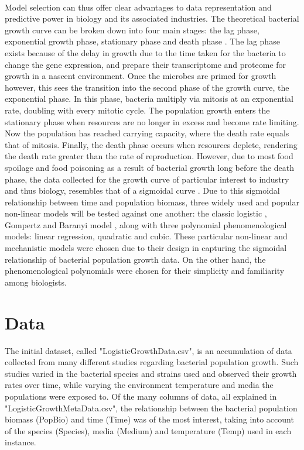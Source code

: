\documentclass[11pt, a4paper]{article} %
\begin{document}
\paragraph{} Model selection can thus offer clear advantages to data representation and predictive power in biology and its associated industries. The theoretical bacterial growth curve can be broken down into four main stages: the lag phase, exponential growth phase, stationary phase and death phase \citep{RN106}. The lag phase exists because of the delay in growth due to the time taken for the bacteria to change the gene expression, and prepare their transcriptome and proteome for growth in a nascent environment. Once the microbes are primed for growth however, this sees the transition into the second phase of the growth curve, the exponential phase. In this phase, bacteria multiply via mitosis at an exponential rate, doubling with every mitotic cycle. The population growth enters the stationary phase when resources are no longer in excess and become rate limiting. Now the population has reached carrying capacity, where the death rate equals that of mitosis. Finally, the death phase occurs when resources deplete, rendering the death rate greater than the rate of reproduction. However, due to most food spoilage and food poisoning as a result of bacterial growth long before the death phase, the data collected for the growth curve of particular interest to industry and thus biology, resembles that of a sigmoidal curve \citep{RN110}. Due to this sigmoidal relationship between time and population biomass, three widely used and popular non-linear models will be tested against one another: the classic logistic \citep{RN106}, Gompertz \citep{RN73} and Baranyi model \citep{RN110}, along with three polynomial phenomenological models: linear regression, quadratic and cubic. These particular non-linear and mechanistic models were chosen due to their design in capturing the sigmoidal relationship of bacterial population growth data. On the other hand, the phenomenological polynomials were chosen for their simplicity and familiarity among biologists. 


\section{Data}

The initial dataset, called "LogisticGrowthData.csv", is an accumulation of data collected from many different studies regarding bacterial population growth. Such studies varied in the bacterial species and strains used and observed their growth rates over time, while varying the environment temperature and media the populations were exposed to. Of the many columns of data, all explained in "LogisticGrowthMetaData.csv", the relationship between the bacterial population biomass (PopBio) and time (Time) was of the most interest, taking into account of the species (Species), media (Medium) and temperature (Temp) used in each instance.
\end{document}
